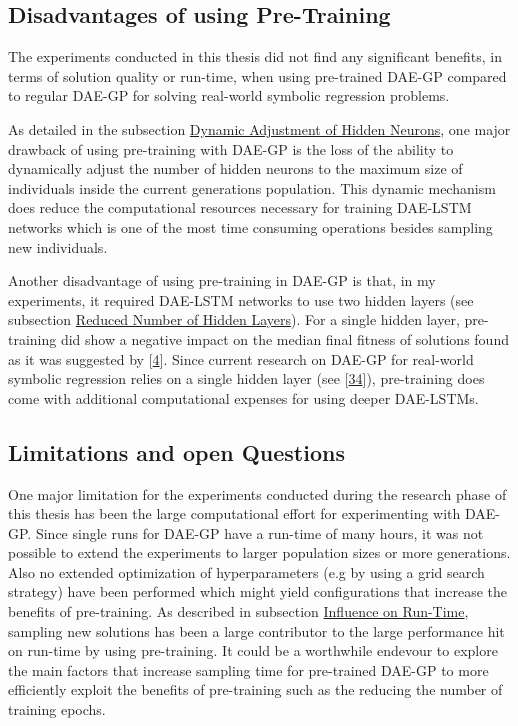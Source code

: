 \documentclass[
  11pt,
]{article}
\begin{document}
\hypertarget{disadvantages-of-using-pre-training}{%
\subsection{Disadvantages of using Pre-Training}\label{disadvantages-of-using-pre-training}}

The experiments conducted in this thesis did not find any significant benefits, in terms of solution quality or run-time, when using pre-trained DAE-GP compared to regular DAE-GP for solving real-world symbolic regression problems.

As detailed in the subsection \protect\hyperlink{dynamic-adjustment-of-hidden-neurons-1}{Dynamic Adjustment of Hidden Neurons}, one major drawback of using pre-training with DAE-GP is the loss of the ability to dynamically adjust the number of hidden neurons to the maximum size of individuals inside the current generations population.
This dynamic mechanism does reduce the computational resources necessary for training DAE-LSTM networks which is one of the most time consuming operations besides sampling new individuals.

Another disadvantage of using pre-training in DAE-GP is that, in my experiments, it required DAE-LSTM networks to use two hidden layers (see subsection \protect\hyperlink{reduced-number-of-hidden-layers-1}{Reduced Number of Hidden Layers}).
For a single hidden layer, pre-training did show a negative impact on the median final fitness of solutions found as it was suggested by {[}\protect\hyperlink{ref-pmlr-v9-erhan10a}{4}{]}.
Since current research on DAE-GP for real-world symbolic regression relies on a single hidden layer (see {[}\protect\hyperlink{ref-dae-gp_2022_symreg}{34}{]}), pre-training does come with additional computational expenses for using deeper DAE-LSTMs.

\hypertarget{limitations-and-open-questions}{%
\subsection{Limitations and open Questions}\label{limitations-and-open-questions}}

One major limitation for the experiments conducted during the research phase of this thesis has been the large computational effort for experimenting with DAE-GP.
Since single runs for DAE-GP have a run-time of many hours, it was not possible to extend the experiments to larger population sizes or more generations.
Also no extended optimization of hyperparameters (e.g by using a grid search strategy) have been performed which might yield configurations that increase the benefits of pre-training.
As described in subsection \protect\hyperlink{influence-on-run-time-1}{Influence on Run-Time}, sampling new solutions has been a large contributor to the large performance hit on run-time by using pre-training.
It could be a worthwhile endevour to explore the main factors that increase sampling time for pre-trained DAE-GP to more efficiently exploit the benefits of pre-training such as the reducing the number of training epochs.
\end{document}
